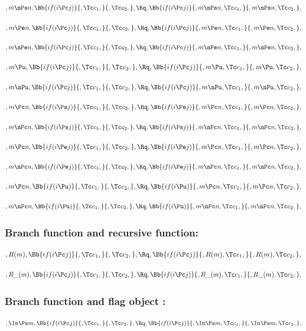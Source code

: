 \[,m \nPs n, \Bb{if(i \Pc j)}{,\Tc c_1,}{,\Tc c_2,}, \Rq , \Bb{if(i \Pc j)}{,m \nPs n,\Tc c_1,}{,m \nPs n,\Tc c_2,},\]
\bigskip
\bigskip

\[,m \Pe n, \Bb{if(i \Pc j)}{,\Tc c_1,}{,\Tc c_2,}, \Rq , \Bb{if(i \Pc j)}{,m \Pe n,\Tc c_1,}{,m \Pe n,\Tc c_2,},\]
\bigskip
\bigskip

\[,m \nPe n, \Bb{if(i \Pc j)}{,\Tc c_1,}{,\Tc c_2,}, \Rq , \Bb{if(i \Pc j)}{,m \nPe n,\Tc c_1,}{,m \nPe n,\Tc c_2,},\]
\bigskip
\bigskip

\[,m \Pu, \Bb{if(i \Pc j)}{,\Tc c_1,}{,\Tc c_2,}, \Rq , \Bb{if(i \Pc j)}{,m \Pu,\Tc c_1,}{,m \Pu,\Tc c_2,},\]
\bigskip
\bigskip

\[,m \nPu, \Bb{if(i \Pc j)}{,\Tc c_1,}{,\Tc c_2,}, \Rq , \Bb{if(i \Pc j)}{,m \nPu,\Tc c_1,}{,m \nPu,\Tc c_2,},\]
\bigskip
\bigskip


\[,m \Pc n, \Bb{if(i \Ps j)}{,\Tc c_1,}{,\Tc c_2,}, \Rq , \Bb{if(i \Ps j)}{,m \Pc n,\Tc c_1,}{,m \Pc n,\Tc c_2,},\]
\bigskip
\bigskip

\[,m \nPc n, \Bb{if(i \Ps j)}{,\Tc c_1,}{,\Tc c_2,}, \Rq , \Bb{if(i \Ps j)}{,m \nPc n,\Tc c_1,}{,m \nPc n,\Tc c_2,},\]
\bigskip
\bigskip

\[,m \Pc n, \Bb{if(i \Pe j)}{,\Tc c_1,}{,\Tc c_2,}, \Rq , \Bb{if(i \Pe j)}{,m \Pc n,\Tc c_1,}{,m \Pc n,\Tc c_2,},\]
\bigskip
\bigskip

\[,m \nPc n, \Bb{if(i \Pe j)}{,\Tc c_1,}{,\Tc c_2,}, \Rq , \Bb{if(i \Pe j)}{,m \nPc n,\Tc c_1,}{,m \nPc n,\Tc c_2,},\]
\bigskip
\bigskip

\[,m \Pc n, \Bb{if(i \Pu)}{,\Tc c_1,}{,\Tc c_2,}, \Rq , \Bb{if(i \Pu)}{,m \Pc n,\Tc c_1,}{,m \Pc n,\Tc c_2,},\]
\bigskip
\bigskip

\[,m \nPc n, \Bb{if(i \Pu)}{,\Tc c_1,}{,\Tc c_2,}, \Rq , \Bb{if(i \Pu)}{,m \nPc n,\Tc c_1,}{,m \nPc n,\Tc c_2,},\]
\bigskip
\bigskip

\bigskip
\bigskip
\bigskip
\bigskip
\subsubsection{Branch function and recursive function:}
\[,R(m), \Bb{if(i \Pc j)}{,\Tc c_1,}{,\Tc c_2,}, \Rq , \Bb{if(i \Pc j)}{,R(m),\Tc c_1,}{,R(m),\Tc c_2,},\]
\bigskip
\bigskip

\[,R\_(m), \Bb{if(i \Pc j)}{,\Tc c_1,}{,\Tc c_2,}, \Rq , \Bb{if(i \Pc j)}{,R\_(m),\Tc c_1,}{,R\_(m),\Tc c_2,},\]
\bigskip
\bigskip


\bigskip
\bigskip
\bigskip
\bigskip
\subsubsection{Branch function and flag object :}
\[,\In \Ps m, \Bb{if(i \Pc j)}{,\Tc c_1,}{,\Tc c_2,}, \Rq , \Bb{if(i \Pc j)}{,\In \Ps m,\Tc c_1,}{,\In \Ps m,\Tc c_2,},\]
\bigskip
\bigskip

